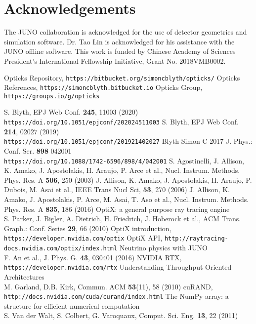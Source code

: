 \documentclass{webofc}
\begin{document}
\section*{Acknowledgements}
%
The JUNO collaboration is acknowledged for the use of detector 
geometries and simulation software. Dr. Tao Lin is acknowledged for his assistance with 
the JUNO offline software. 
This work is funded by Chinese Academy of Sciences President’s International Fellowship Initiative,
Grant No. 2018VMB0002.
%
%
%
\newpage
\begin{thebibliography}{}
%
Opticks Repository, {\tt https://bitbucket.org/simoncblyth/opticks/}
Opticks References, {\tt https://simoncblyth.bitbucket.io}
Opticks Group, {\tt https://groups.io/g/opticks}

S. Blyth, EPJ Web Conf. {\bf 245}, 11003 (2020) \\
{\tt https://doi.org/10.1051/epjconf/202024511003}
%
S. Blyth, EPJ Web Conf. {\bf 214}, 02027 (2019) \\
{\tt https://doi.org/10.1051/epjconf/201921402027}
Blyth Simon C 2017 J. Phys.: Conf. Ser. {\bf 898} 042001 \\
{\tt https://doi.org/10.1088/1742-6596/898/4/042001}
%
%
%
S. Agostinelli, J. Allison, K. Amako, J. Apostolakis, H. Araujo, P. Arce et al., Nucl. Instrum. Methods. Phys. Res. A {\bf 506}, 250 (2003)
J. Allison, K. Amako, J. Apostolakis, H. Araujo, P. Dubois, M. Asai et al., IEEE Trans Nucl Sci, {\bf 53}, 270 (2006)
J. Allison, K. Amako, J. Apostolakis, P. Arce, M. Asai, T. Aso et al., Nucl. Instrum. Methods. Phys. Res. A {\bf 835}, 186 (2016)
%
%
%
OptiX: a general purpose ray tracing engine \\
S. Parker, J. Bigler, A. Dietrich, H. Friedrich, J. Hoberock et al., ACM Trans. Graph.: Conf. Series {\bf 29}, 66 (2010)
OptiX introduction, {\tt https://developer.nvidia.com/optix}
OptiX API, {\tt http://raytracing-docs.nvidia.com/optix/index.html}
Neutrino physics with JUNO \\
F. An et al., J. Phys. G. {\bf 43}, 030401 (2016) 
NVIDIA RTX, {\tt https://developer.nvidia.com/rtx}
%
%
Understanding Throughput Oriented Architectures \\
M. Garland, D.B. Kirk, Commun. ACM {\bf 53}(11), 58 (2010) 
cuRAND, {\tt http://docs.nvidia.com/cuda/curand/index.html}
The NumPy array: a structure for efficient numerical computation \\
S. Van der Walt, S. Colbert, G. Varoquaux, Comput. Sci. Eng. {\bf 13}, 22 (2011)
%
\end{thebibliography}
%
\end{document}
